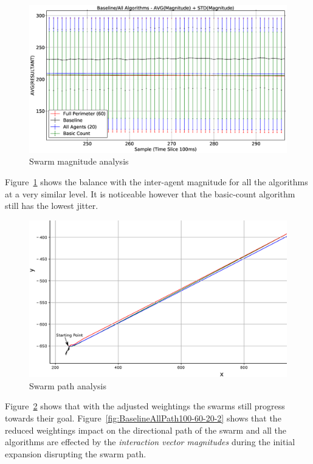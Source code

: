\begin{figure}[H]
\begin{center}
\includegraphics[width=14cm]{CHAPTER-6/figures/BaselineAllMag100-60-20-2}
\end{center}
\caption{Swarm magnitude analysis\label{fig:BaselineAllMag100-60-20-2}}
\end{figure}

Figure~\ref{fig:BaselineAllMag100-60-20-2} shows the balance with the inter-agent magnitude for all the algorithms at a very similar level. It is noticeable however that the basic-count algorithm still has the lowest jitter.

\begin{figure}[H]
\begin{center}
\includegraphics[width=14cm]{CHAPTER-6/figures/BaselineAllPath100-60-20-1}
\end{center}
\caption{Swarm path analysis\label{fig:BaselineAllPath100-60-20-1}}
\end{figure}

Figure~\ref{fig:BaselineAllPath100-60-20-1} shows that with the adjusted weightings the swarms still progress towards their goal. Figure~\ref{fig:BaselineAllPath100-60-20-2} shows that the reduced weightings impact on the directional path of the swarm and all the algorithms are effected by the \textit{interaction vector magnitudes} during the initial expansion disrupting the swarm path.

